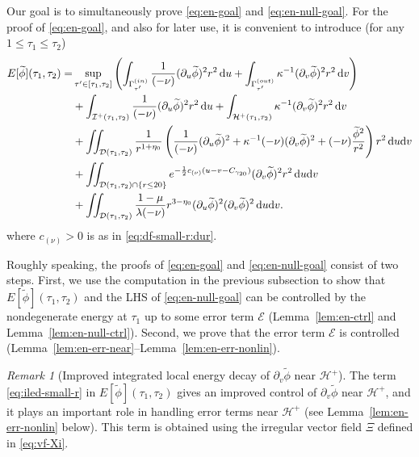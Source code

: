 \documentclass[10pt, reqno]{amsart}
\theoremstyle{definition}
\theoremstyle{remark}
\newtheorem{remark}[theorem]{Remark}
\theoremstyle{conjecture}
\numberwithin{equation}{section}
\newcommand{\set}[1]{\{#1\}}
\newcommand{\ud}{\mathrm{d}}
\newcommand{\rd}{\partial}
\newcommand{\0}{\emptyset}
\newcommand{\gmm}{\gamma}
\newcommand{\Gmm}{\Gamma}
\newcommand{\kpp}{\kappa}
\newcommand{\lmb}{\lambda}
\newcommand{\calD}{\mathcal D}
\newcommand{\calE}{\mathcal E}
\newcommand{\calH}{\mathcal H}
\newcommand{\calI}{\mathcal I}
\newcommand{\dur}{\nu}
\newcommand{\dvr}{\lmb}
\newcommand{\EH}{\calH^{+}}
\newcommand{\NI}{\calI^{+}}						%
\newcommand{\phibg}{\overline{\phi}}				%
\newcommand{\phidf}{\widetilde{\phi}}				%
\begin{document}
Our goal is to simultaneously prove \eqref{eq:en-goal} and \eqref{eq:en-null-goal}. For the proof of \eqref{eq:en-goal}, and also for later use, it is convenient to introduce (for any $1 \leq \tau_{1} \leq \tau_{2}$)
\begin{align}
	E[\phidf](\tau_{1}, \tau_{2}) 
	= & \sup_{\tau' \in [\tau_{1}, \tau_{2}]} \left( \int_{\Gmm^{(in)}_{\tau'}} \frac{1}{(-\dur)} (\rd_{u} \phidf)^{2} r^{2} \, \ud u 
	+ \int_{\Gmm^{(out)}_{\tau'}} \kpp^{-1} (\rd_{v} \phidf)^{2} r^{2} \, \ud v  \right) \notag \\
	&+ \int_{\NI(\tau_{1}, \tau_{2})} \frac{1}{(-\dur)} (\rd_{u} \phidf)^{2} r^{2} \, \ud u
	+ \int_{\EH(\tau_{1}, \tau_{2})} \kpp^{-1} (\rd_{v} \phidf)^{2} r^{2} \, \ud v  \notag \\
	& + \iint_{\calD(\tau_{1}, \tau_{2})} \frac{1}{r^{1+\eta_{0}}} 
		\left( \frac{1}{(-\dur)} (\rd_{u} \phidf)^{2} + \kpp^{-1} (-\dur) (\rd_{v} \phidf)^{2} + (-\dur) \frac{\phidf^{2}}{r^{2}} \right) r^{2} \, \ud u \ud v \notag \\
	& + \iint_{\calD(\tau_{1}, \tau_{2}) \cap \set{r \leq 20}} e^{- \frac{1}{2} c_{(\dur)} (u - v - C_{\gmm_{20}})} (\rd_{v} \phidf)^{2} r^{2} \, \ud u \ud v 		\label{eq:iled-small-r} \\
	& + \iint_{\calD(\tau_{1}, \tau_{2})} \frac{1-\mu}{\dvr (- \dur)} r^{3-\eta_{0}} (\rd_{u} \phidf)^{2} (\rd_{v} \phidf)^{2} \, \ud u \ud v.	\label{eq:int-morawetz}
\end{align}
where $c_{(\dur)} > 0$ is as in \eqref{eq:df-small-r:dur}.

Roughly speaking, the proofs of \eqref{eq:en-goal} and \eqref{eq:en-null-goal} consist of two steps. First, we use the computation in the previous subsection to show that $E[\phidf](\tau_{1}, \tau_{2})$ and the LHS of \eqref{eq:en-null-goal} can be controlled by the nondegenerate energy at $\tau_{1}$ up to some error term $\calE$ (Lemma~\ref{lem:en-ctrl} and Lemma~\ref{lem:en-null-ctrl}). Second, we prove that the error term $\calE$ is controlled (Lemma~\ref{lem:en-err-near}--Lemma~\ref{lem:en-err-nonlin}).

\begin{remark}[Improved integrated local energy decay of $\rd_{v} \phidf$ near $\EH$] \label{rem:iled-small-r} 
The term \eqref{eq:iled-small-r} in $E[\phidf](\tau_{1}, \tau_{2})$ gives an improved control of $\rd_{v} \phidf$ near $\EH$, and it plays an important role in handling error terms near $\EH$ (see Lemma~\ref{lem:en-err-nonlin} below). This term is obtained using the irregular vector field $\Xi$ defined in \eqref{eq:vf-Xi}.
\end{remark}
\end{document}
